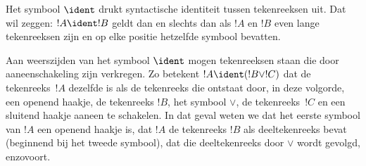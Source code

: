 \documentclass[../../../include/open-logic-section]{subfiles}
\begin{document}
\begin{defn}
Het symbool $\ident$ drukt syntactische identiteit tussen tekenreeksen
uit. Dat wil zeggen: $!A \ident !B$ geldt dan en slechts dan als $!A$ en
$!B$ even lange tekenreeksen zijn en op elke positie hetzelfde symbool
bevatten.
\end{defn}

Aan weerszijden van het symbool $\ident$ mogen tekenreeksen staan die
door aaneenschakeling zijn verkregen. Zo betekent $!A \ident (!B \lor
!C)$ dat de tekenreeks~$!A$ dezelfde is als de tekenreeks die ontstaat
door, in deze volgorde, een openend haakje, de tekenreeks $!B$, het
symbool $\lor$, de tekenreeks~$!C$ en een sluitend haakje aaneen te
schakelen. In dat geval weten we dat het eerste symbool van $!A$ een
openend haakje is, dat $!A$ de tekenreeks $!B$ als deeltekenreeks bevat
(beginnend bij het tweede symbool), dat die deeltekenreeks door $\lor$
wordt gevolgd, enzovoort.
\end{document}

